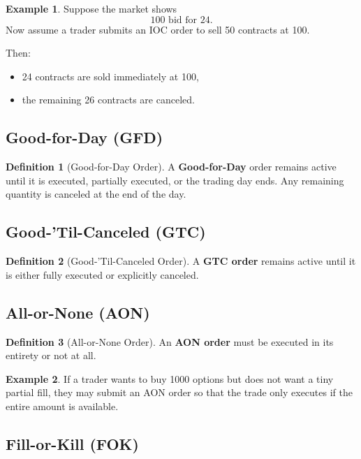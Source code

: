 \documentclass[11pt]{article}
\theoremstyle{definition}
\newtheorem{definition}{Definition}[section]
\newtheorem{example}{Example}[section]
\begin{document}
\begin{example}
Suppose the market shows
\[
100 \text{ bid for } 24.
\]
Now assume a trader submits an IOC order to sell 50 contracts at 100.

Then:
\begin{itemize}[leftmargin=2em]
    \item 24 contracts are sold immediately at 100,
    \item the remaining 26 contracts are canceled.
\end{itemize}
\end{example}

\subsection{Good-for-Day (GFD)}

\begin{definition}[Good-for-Day Order]
A \textbf{Good-for-Day} order remains active until it is executed, partially executed, or the trading day ends. Any remaining quantity is canceled at the end of the day.
\end{definition}

\subsection{Good-'Til-Canceled (GTC)}

\begin{definition}[Good-'Til-Canceled Order]
A \textbf{GTC order} remains active until it is either fully executed or explicitly canceled.
\end{definition}

\subsection{All-or-None (AON)}

\begin{definition}[All-or-None Order]
An \textbf{AON order} must be executed in its entirety or not at all.
\end{definition}

\begin{example}
If a trader wants to buy 1000 options but does not want a tiny partial fill, they may submit an AON order so that the trade only executes if the entire amount is available.
\end{example}

\subsection{Fill-or-Kill (FOK)}
\end{document}
